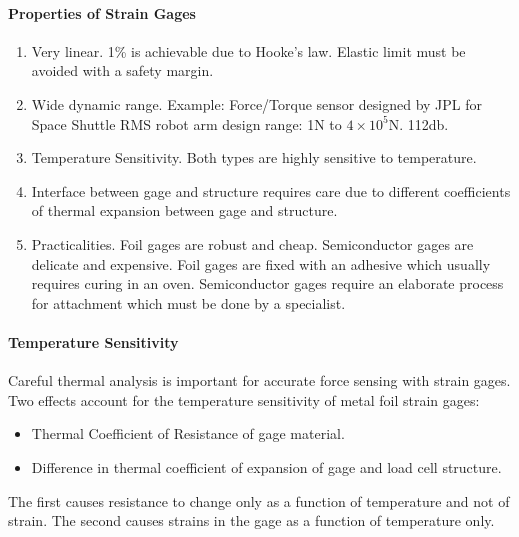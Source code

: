 \paragraph{Properties of Strain Gages}
\begin{enumerate}
\item Very linear.  1\% is achievable due to Hooke's law.
Elastic limit must be avoided with a safety margin.

\item Wide dynamic range.  Example: Force/Torque sensor designed
by JPL for Space Shuttle RMS robot arm design range:  1N to $4 \times 10^5$N.
112db.

\item Temperature Sensitivity.  Both types are highly sensitive to temperature.

\item Interface between gage and structure requires care due to
different coefficients of thermal expansion between gage and structure.

\item Practicalities.  Foil gages are robust and cheap. Semiconductor
gages are delicate and expensive. Foil gages are fixed with an adhesive
which usually requires curing in an oven.  Semiconductor gages require
an elaborate process for attachment which must be done by a specialist.

%
\end{enumerate}



\paragraph{Temperature Sensitivity}
Careful thermal analysis is important for accurate force sensing
with strain gages. Two effects account for the temperature sensitivity
of metal foil strain gages:
\begin{itemize}
\item Thermal Coefficient of Resistance of gage material.
\item Difference in thermal coefficient of expansion of gage
and load cell structure.
\end{itemize}
The first causes resistance to change only as a function of temperature
and not of strain.  The second causes strains in the gage as a function
of temperature only.


